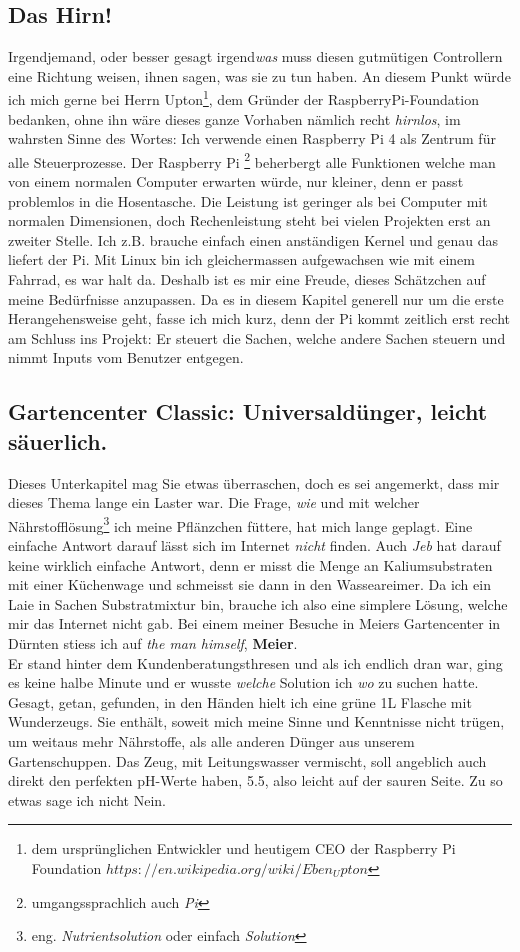 \documentclass[12pt,titlepage,a4paper]{article}
\begin{document}
\subsection{Das Hirn!}
Irgendjemand, oder besser gesagt irgend\textit{was} muss diesen gutmütigen Controllern eine Richtung weisen, ihnen sagen, was sie zu tun haben. An diesem Punkt würde ich mich gerne bei Herrn Upton\footnote{dem ursprünglichen Entwickler und heutigem CEO der Raspberry Pi Foundation $https://en.wikipedia.org/wiki/Eben_Upton$}, dem Gründer der RaspberryPi-Foundation bedanken, ohne ihn wäre dieses ganze Vorhaben nämlich recht \textit{hirnlos}, im wahrsten Sinne des Wortes: Ich verwende einen Raspberry Pi 4 als Zentrum für alle Steuerprozesse. Der Raspberry Pi \footnote{umgangssprachlich auch \textit{Pi}} beherbergt alle Funktionen welche man von einem normalen Computer erwarten würde, nur kleiner, denn er passt problemlos in die Hosentasche. Die Leistung ist geringer als bei Computer mit normalen Dimensionen, doch Rechenleistung steht bei vielen Projekten erst an zweiter Stelle. Ich z.B. brauche einfach einen anständigen Kernel und genau das liefert der Pi. Mit Linux bin ich gleichermassen aufgewachsen wie mit einem Fahrrad, es war halt da. Deshalb ist es mir eine Freude, dieses Schätzchen auf meine Bedürfnisse anzupassen. Da es in diesem Kapitel generell nur um die erste Herangehensweise geht, fasse ich mich kurz, denn der Pi kommt zeitlich erst recht am Schluss ins Projekt: Er steuert die Sachen, welche andere Sachen steuern und nimmt Inputs vom Benutzer entgegen.

\subsection{Gartencenter Classic: Universaldünger, leicht säuerlich.}
Dieses Unterkapitel mag Sie etwas überraschen, doch es sei angemerkt, dass mir dieses Thema lange ein Laster war. Die Frage, \textit{wie} und mit welcher Nährstofflösung\footnote{eng. \textit{Nutrientsolution} oder einfach \textit{Solution}} ich meine Pflänzchen füttere, hat mich lange geplagt. Eine einfache Antwort darauf lässt sich im Internet \textit{nicht} finden. Auch \textit{Jeb} hat darauf keine wirklich einfache Antwort, denn er misst die Menge an Kaliumsubstraten mit einer Küchenwage und schmeisst sie dann in den Wasseareimer. Da ich ein Laie in Sachen Substratmixtur bin, brauche ich also eine simplere Lösung, welche mir das Internet nicht gab. Bei einem meiner Besuche in Meiers Gartencenter in Dürnten stiess ich auf \textit{the man himself}, \textbf{Meier}. \\ Er stand hinter dem Kundenberatungsthresen und als ich endlich dran war, ging es keine halbe Minute und er wusste \textit{welche} Solution ich \textit{wo} zu suchen hatte. Gesagt, getan, gefunden, in den Händen hielt ich eine grüne 1L Flasche mit Wunderzeugs. Sie enthält, soweit mich meine Sinne und Kenntnisse nicht trügen, um weitaus mehr Nährstoffe, als alle anderen Dünger aus unserem Gartenschuppen. Das Zeug, mit Leitungswasser vermischt, soll angeblich auch direkt den perfekten pH-Werte haben, 5.5, also leicht auf der sauren Seite. Zu so etwas sage ich nicht Nein. 
\end{document}
